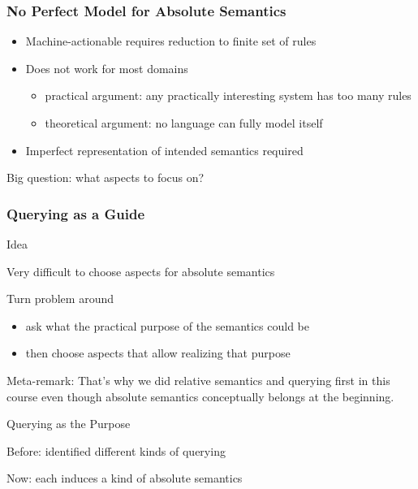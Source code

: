 \begin{frame}\frametitle{No Perfect Model for Absolute Semantics}
\begin{itemize}
\item Machine-actionable requires reduction to finite set of rules
\item Does not work for most domains
 \begin{itemize}
 \item practical argument: any practically interesting system has too many rules
 \item theoretical argument: no language can fully model itself
 \end{itemize}
\item Imperfect representation of intended semantics required
\end{itemize}

Big question: what aspects to focus on?
\end{frame}

\begin{frame}\frametitle{Querying as a Guide}
\begin{blockitems}{Idea}
\item Very difficult to choose aspects for absolute semantics
\item Turn problem around
 \begin{itemize}
 \item ask what the practical purpose of the semantics could be
 \item then choose aspects that allow realizing that purpose
 \end{itemize}
\end{blockitems}

Meta-remark: That's why we did relative semantics and querying first in this course even though absolute semantics conceptually belongs at the beginning.

\begin{blockitems}{Querying as the Purpose}
\item Before: identified different kinds of querying
\item Now: each induces a kind of absolute semantics
\end{blockitems}
\end{frame}


